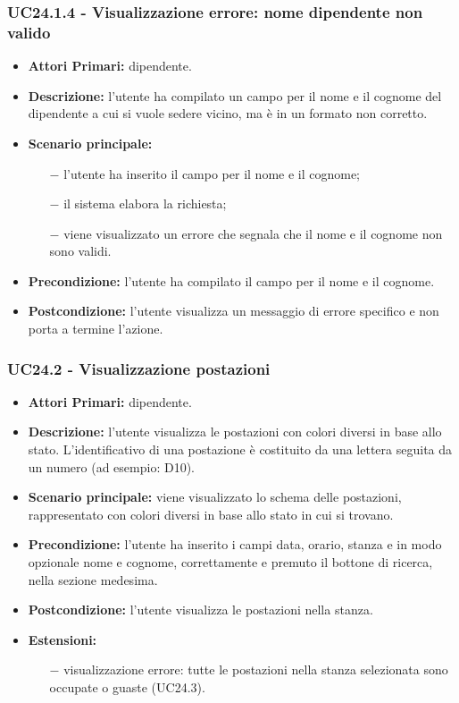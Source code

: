 \subsubsection{ UC24.1.4 - Visualizzazione errore: nome dipendente non valido }
\begin{itemize}
	\item\textbf{Attori Primari:} dipendente.
	\item\textbf{Descrizione:} l’utente ha compilato un campo per il nome e il cognome del dipendente a cui si vuole sedere vicino, ma è in un formato non corretto.
	\item\textbf{Scenario principale:} 
	\begin{itemize}
		\item[$-$] l’utente ha inserito il campo per il nome e il cognome;
		\item[$-$] il sistema elabora la richiesta;
		\item[$-$] viene visualizzato un errore che segnala che  il nome e il cognome non sono validi.
	\end{itemize}
	\item\textbf{Precondizione:} l’utente ha compilato il campo per il nome e il cognome.
	\item\textbf{Postcondizione:} l’utente visualizza un messaggio di errore specifico e non porta a termine l’azione.
\end{itemize}
\subsubsection{ UC24.2 - Visualizzazione postazioni  }
\begin{itemize}
	\item\textbf{Attori Primari:} dipendente.
	\item\textbf{Descrizione:} l’utente visualizza le postazioni con colori diversi in base allo stato. L'identificativo di una postazione è costituito da una lettera seguita da un numero (ad esempio: D10). 
	\item\textbf{Scenario principale:} viene visualizzato lo schema delle postazioni, rappresentato con colori diversi in base allo stato in cui si trovano.
	\item\textbf{Precondizione:} l’utente ha inserito i campi data, orario, stanza e in modo opzionale nome e cognome, correttamente e premuto il bottone di ricerca, nella sezione 
	medesima.
	\item\textbf{Postcondizione:} l’utente visualizza le postazioni nella stanza.
	\item\textbf{Estensioni:}
	\begin{itemize}
		\item[$-$] visualizzazione errore: tutte le postazioni nella stanza selezionata sono occupate o guaste (UC24.3).
	\end{itemize}
\end{itemize}

